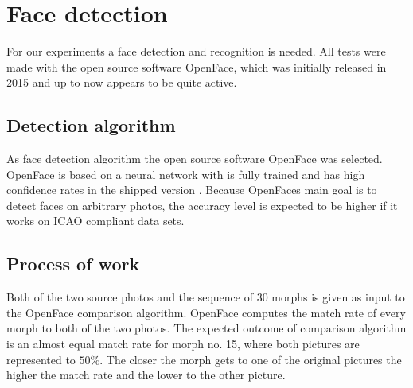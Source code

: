 \section{Face detection}
\label{detection}
For our experiments a face detection and recognition is needed. All tests were made with the open source software OpenFace, which was initially released in 2015 and up to now appears to be quite active\cite{amos2016openface}.

\subsection{Detection algorithm} %
As face detection algorithm the open source software OpenFace was selected. OpenFace is based on a neural network with is fully trained and has high confidence rates in the shipped version \cite{baltruvsaitis2016openface}. Because OpenFaces main goal is to detect faces on arbitrary photos, the accuracy level is expected to be higher if it works on ICAO compliant data sets. 


\subsection{Process of work}
Both of the two source photos and the sequence of 30 morphs is given as input to the OpenFace comparison algorithm. OpenFace computes the match rate of every morph to both of the two photos. 
The expected outcome of comparison algorithm is an almost equal match rate for morph no. 15, where both pictures are represented to $50\%$. The closer the morph gets to one of the original pictures the higher the match rate and the lower to the other picture. 

